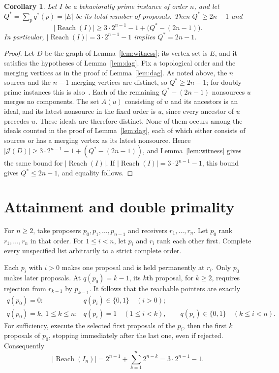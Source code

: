 \documentclass[11pt]{article}
\newtheorem{corollary}[theorem]{Corollary}
\newcommand{\Reach}{\operatorname{Reach}}
\newcommand{\Id}{\mathcal J}
\begin{document}
\begin{corollary}\label{cor:joint}
Let $I$ be a behaviorally prime instance of order $n$, and let
$Q^*=\sum_pq^*(p)=|E|$ be its total number of proposals. Then
$Q^*\ge2n-1$ and
\[
       |\Reach(I)|\ge3\cdot2^{n-1}-1+\bigl(Q^*-(2n-1)\bigr).
\]
In particular, $|\Reach(I)|=3\cdot2^{n-1}-1$ implies $Q^*=2n-1$.
\end{corollary}
\begin{proof}
Let $D$ be the graph of Lemma~\ref{lem:witness}; its vertex set is $E$,
and it satisfies the hypotheses of Lemma~\ref{lem:dag}. Fix a
topological order and the merging vertices as in the proof of
Lemma~\ref{lem:dag}. As noted above, the $n$ sources and the $n-1$
merging vertices are distinct, so $Q^*\ge2n-1$; for doubly prime
instances this is also~\cite[Proposition~21.4]{ishida}. Each of the
remaining $Q^*-(2n-1)$ nonsources $u$ merges no components. The set
$A(u)$ consisting of $u$ and its ancestors is an ideal, and its latest
nonsource in the fixed order is $u$, since every ancestor of $u$
precedes $u$. These ideals are therefore distinct. None of them occurs
among the ideals counted in the proof of Lemma~\ref{lem:dag}, each of
which either consists of sources or has a merging vertex as its latest
nonsource. Hence $|\Id(D)|\ge3\cdot2^{n-1}-1+(Q^*-(2n-1))$, and
Lemma~\ref{lem:witness} gives the same bound for $|\Reach(I)|$. If
$|\Reach(I)|=3\cdot2^{n-1}-1$, this bound gives $Q^*\le2n-1$, and
equality follows.
\end{proof}

\section{Attainment and double primality}\label{sec:sharp}

For $n\ge2$, take proposers $p_0,p_1,\ldots,p_{n-1}$ and receivers
$r_1,\ldots,r_n$. Let $p_0$ rank $r_1,\ldots,r_n$ in that order.
For $1\le i<n$, let $p_i$ and $r_i$ rank each other first. Complete
every unspecified list arbitrarily to a strict complete order.

Each $p_i$ with $i>0$ makes one proposal and is held permanently at
$r_i$. Only $p_0$ makes later proposals. At $q(p_0)=k-1$, its $k$th
proposal, for $k\ge2$, requires rejection from $r_{k-1}$ by $p_{k-1}$.
It follows that the reachable pointers are exactly
\[
 \begin{array}{ll}
 q(p_0)=0:&q(p_i)\in\{0,1\}\quad(i>0);\\
 q(p_0)=k,\ 1\le k\le n:&q(p_i)=1\quad(1\le i<k),\qquad
 q(p_i)\in\{0,1\}\quad(k\le i<n).
 \end{array}
\]
For sufficiency, execute the selected first proposals of the $p_i$,
then the first $k$ proposals of $p_0$, stopping immediately after the
last one, even if rejected. Consequently
\[
 |\Reach(I_n)|=2^{n-1}+\sum_{k=1}^{n}2^{n-k}
             =3\cdot2^{n-1}-1.
\]
\end{document}

